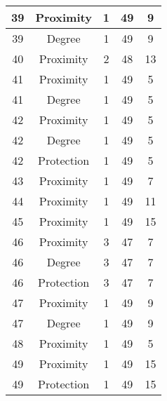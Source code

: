 \documentclass[results.tex]{subfiles}
\begin{document}
\begin{center}
\begin{tabular}{| c || c | c | c | c |}
    \hline
    39 & Proximity & 1 & 49 & 9 \\ 
    \hline
    39 & Degree & 1 & 49 & 9 \\ 
    \hline
    40 & Proximity & 2 & 48 & 13 \\ 
    \hline
    41 & Proximity & 1 & 49 & 5 \\ 
    \hline
    41 & Degree & 1 & 49 & 5 \\ 
    \hline
    42 & Proximity & 1 & 49 & 5 \\ 
    \hline
    42 & Degree & 1 & 49 & 5 \\ 
    \hline
    42 & Protection & 1 & 49 & 5 \\ 
    \hline
    43 & Proximity & 1 & 49 & 7 \\ 
    \hline
    44 & Proximity & 1 & 49 & 11 \\ 
    \hline
    45 & Proximity & 1 & 49 & 15 \\ 
    \hline
    46 & Proximity & 3 & 47 & 7 \\ 
    \hline
    46 & Degree & 3 & 47 & 7 \\ 
    \hline
    46 & Protection & 3 & 47 & 7 \\ 
    \hline
    47 & Proximity & 1 & 49 & 9 \\ 
    \hline
    47 & Degree & 1 & 49 & 9 \\ 
    \hline
    48 & Proximity & 1 & 49 & 5 \\ 
    \hline
    49 & Proximity & 1 & 49 & 15 \\ 
    \hline
    49 & Protection & 1 & 49 & 15 \\ 
    \hline   \end{tabular}
\end{center}
\end{document}
